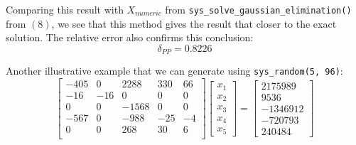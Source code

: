 \documentclass[letterpaper,12pt]{article}
\begin{document}
Comparing this result with $X_{numeric}$ from \verb|sys_solve_gaussian_elimination()| from  $(8)$, we see that this method gives the result that closer to the exact solution. The relative error also confirms this conclusion:
\begin{equation}
    \delta_{PP} = 0.8226
\end{equation}

Another illustrative example that we can generate using \verb|sys_random(5, 96)|:
\begin{equation}
    \begin{bmatrix}
        -405    &      0      &       2288     &     330    &       66\\
        -16     &      -16    &       0        &     0      &       0\\
        0       &      0      &       -1568    &     0      &       0\\
        -567    &      0      &       -988     &     -25    &       -4\\
        0       &      0      &       268      &     30     &       6\\
    \end{bmatrix}
    \begin{bmatrix}
        x_1\\
        x_2\\
        x_3\\
        x_4\\
        x_5
    \end{bmatrix}
    =
    \begin{bmatrix}
        2175989\\
        9536\\
        -1346912\\
        -720793\\
        240484
    \end{bmatrix}
\end{equation}
\end{document}
